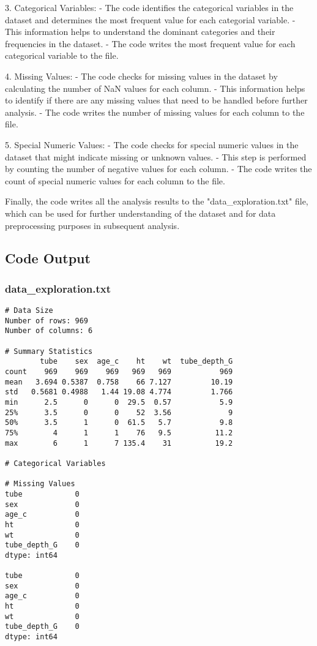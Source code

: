 \documentclass[11pt]{article}
\begin{document}
3. Categorical Variables:
   - The code identifies the categorical variables in the dataset and determines the most frequent value for each categorial variable. 
   - This information helps to understand the dominant categories and their frequencies in the dataset. 
   - The code writes the most frequent value for each categorical variable to the file. 

4. Missing Values:
   - The code checks for missing values in the dataset by calculating the number of NaN values for each column. 
   - This information helps to identify if there are any missing values that need to be handled before further analysis. 
   - The code writes the number of missing values for each column to the file. 

5. Special Numeric Values:
   - The code checks for special numeric values in the dataset that might indicate missing or unknown values. 
   - This step is performed by counting the number of negative values for each column. 
   - The code writes the count of special numeric values for each column to the file. 

Finally, the code writes all the analysis results to the "data\_exploration.txt" file, which can be used for further understanding of the dataset and for data preprocessing purposes in subsequent analysis.

\subsection{Code Output}

\subsubsection*{data\_exploration.txt}

\begin{Verbatim}[tabsize=4]
# Data Size
Number of rows: 969
Number of columns: 6

# Summary Statistics
        tube    sex  age_c    ht    wt  tube_depth_G
count    969    969    969   969   969           969
mean   3.694 0.5387  0.758    66 7.127         10.19
std   0.5681 0.4988   1.44 19.08 4.774         1.766
min      2.5      0      0  29.5  0.57           5.9
25%      3.5      0      0    52  3.56             9
50%      3.5      1      0  61.5   5.7           9.8
75%        4      1      1    76   9.5          11.2
max        6      1      7 135.4    31          19.2

# Categorical Variables

# Missing Values
tube            0
sex             0
age_c           0
ht              0
wt              0
tube_depth_G    0
dtype: int64

tube            0
sex             0
age_c           0
ht              0
wt              0
tube_depth_G    0
dtype: int64

\end{Verbatim}
\end{document}
